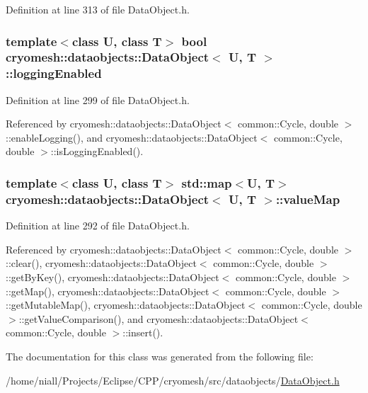 \-Definition at line 313 of file \-Data\-Object.\-h.

\hypertarget{classcryomesh_1_1dataobjects_1_1DataObject_a02128a10817ab449328375401f0199a9}{
\subsubsection[{logging\-Enabled}]{\setlength{\rightskip}{0pt plus 5cm}template$<$class \-U, class \-T$>$ bool {\bf cryomesh\-::dataobjects\-::\-Data\-Object}$<$ \-U, \-T $>$\-::{\bf logging\-Enabled}}}\label{classcryomesh_1_1dataobjects_1_1DataObject_a02128a10817ab449328375401f0199a9}


\-Definition at line 299 of file \-Data\-Object.\-h.



\-Referenced by cryomesh\-::dataobjects\-::\-Data\-Object$<$ common\-::\-Cycle, double $>$\-::enable\-Logging(), and cryomesh\-::dataobjects\-::\-Data\-Object$<$ common\-::\-Cycle, double $>$\-::is\-Logging\-Enabled().

\hypertarget{classcryomesh_1_1dataobjects_1_1DataObject_a9f345f10bea7d0554e09dbb4f598cd57}{
\subsubsection[{value\-Map}]{\setlength{\rightskip}{0pt plus 5cm}template$<$class \-U, class \-T$>$ std\-::map$<$\-U, \-T$>$ {\bf cryomesh\-::dataobjects\-::\-Data\-Object}$<$ \-U, \-T $>$\-::{\bf value\-Map}}}\label{classcryomesh_1_1dataobjects_1_1DataObject_a9f345f10bea7d0554e09dbb4f598cd57}


\-Definition at line 292 of file \-Data\-Object.\-h.



\-Referenced by cryomesh\-::dataobjects\-::\-Data\-Object$<$ common\-::\-Cycle, double $>$\-::clear(), cryomesh\-::dataobjects\-::\-Data\-Object$<$ common\-::\-Cycle, double $>$\-::get\-By\-Key(), cryomesh\-::dataobjects\-::\-Data\-Object$<$ common\-::\-Cycle, double $>$\-::get\-Map(), cryomesh\-::dataobjects\-::\-Data\-Object$<$ common\-::\-Cycle, double $>$\-::get\-Mutable\-Map(), cryomesh\-::dataobjects\-::\-Data\-Object$<$ common\-::\-Cycle, double $>$\-::get\-Value\-Comparison(), and cryomesh\-::dataobjects\-::\-Data\-Object$<$ common\-::\-Cycle, double $>$\-::insert().



\-The documentation for this class was generated from the following file\-:\begin{DoxyCompactItemize}
\item 
/home/niall/\-Projects/\-Eclipse/\-C\-P\-P/cryomesh/src/dataobjects/\hyperlink{DataObject_8h}{\-Data\-Object.\-h}\end{DoxyCompactItemize}
